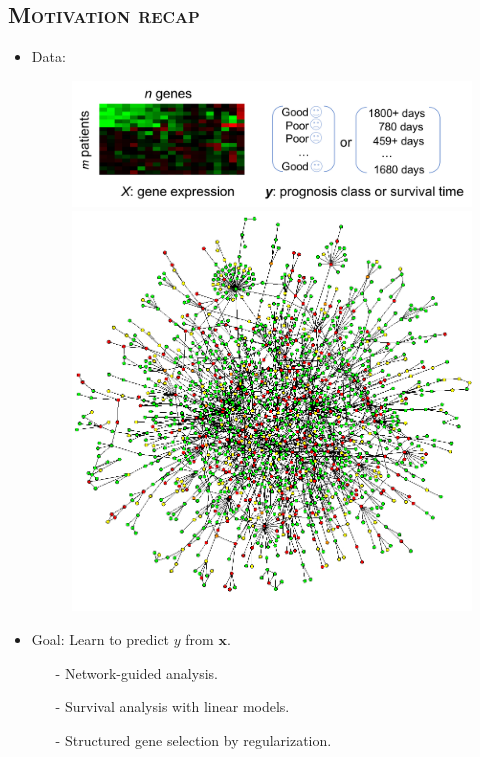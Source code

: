 \documentclass[xcolor=x11names,compress]{beamer}
\theoremstyle{plain}
\renewcommand{\(}{\begin{columns}}
\renewcommand{\)}{\end{columns}}
\newcommand{\<}[1]{\begin{column}{#1}}
\renewcommand{\>}{\end{column}}
\begin{document}
\subsection{\scshape Motivation recap}
\begin{frame}{\insertsubsection}
	
	\begin{itemize}
		\item Data: 
		\begin{figure}
			\centering
			\includegraphics[width=0.7\linewidth]{slides/prognosis}%
			\hskip 0.1cm%
			\includegraphics[width=0.25\linewidth]{slides/ppi}
		\end{figure}
		
		\item Goal: Learn to predict $y$ from $\mathbf{x}$.
		\begin{itemize}
			\item[-] Network-guided analysis.
			\item[-] Survival analysis with linear models.
			\item[-] Structured gene selection by regularization.
		\end{itemize}
	\end{itemize}
	
\end{frame}
\end{document}
